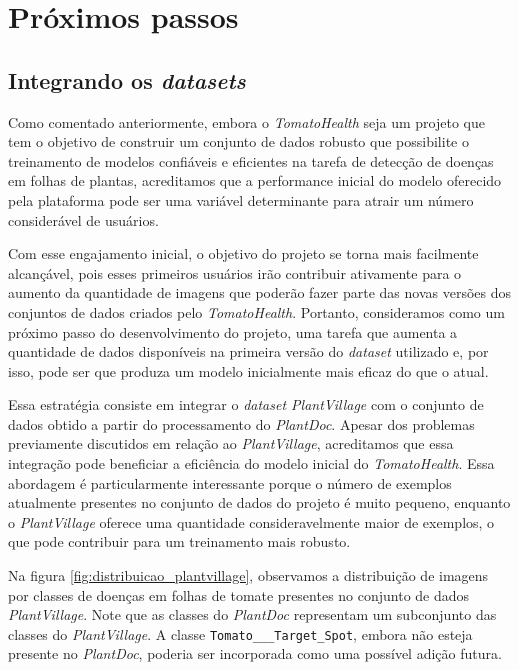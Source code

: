 \section{Próximos passos}
\label{sec:próximos passos}
\subsection{Integrando os \emph{datasets}}
\label{sec:integrando-resultados}
Como comentado anteriormente, embora o \emph{TomatoHealth} seja um projeto que tem o objetivo de construir um conjunto de dados robusto que possibilite o treinamento de modelos confiáveis e eficientes na tarefa de detecção de doenças em folhas de plantas, acreditamos que a performance inicial do modelo oferecido pela plataforma pode ser uma variável determinante para atrair um número considerável de usuários.

Com esse engajamento inicial, o objetivo do projeto se torna mais facilmente alcançável, pois esses primeiros usuários irão contribuir ativamente para o aumento da quantidade de imagens que poderão fazer parte das novas versões dos conjuntos de dados criados pelo \emph{TomatoHealth}. Portanto, consideramos como um próximo passo do desenvolvimento do projeto, uma tarefa que aumenta a quantidade de dados disponíveis na primeira versão do \emph{dataset} utilizado e, por isso, pode ser que produza um modelo inicialmente mais eficaz do que o atual.

Essa estratégia consiste em integrar o \emph{dataset PlantVillage} com o conjunto de dados obtido a partir do processamento do \emph{PlantDoc}. Apesar dos problemas previamente discutidos em relação ao \emph{PlantVillage}, acreditamos que essa integração pode beneficiar a eficiência do modelo inicial do \emph{TomatoHealth}. Essa abordagem é particularmente interessante porque o número de exemplos atualmente presentes no conjunto de dados do projeto é muito pequeno, enquanto o \emph{PlantVillage} oferece uma quantidade consideravelmente maior de exemplos, o que pode contribuir para um treinamento mais robusto.

Na figura \ref{fig:distribuicao_plantvillage}, observamos a distribuição de imagens por classes de doenças em folhas de tomate presentes no conjunto de dados \emph{PlantVillage}. Note que as classes do \emph{PlantDoc} representam um subconjunto das classes do \emph{PlantVillage}. A classe \texttt{Tomato\_\_\_Target\_Spot}, embora não esteja presente no \emph{PlantDoc}, poderia ser incorporada como uma possível adição futura.

